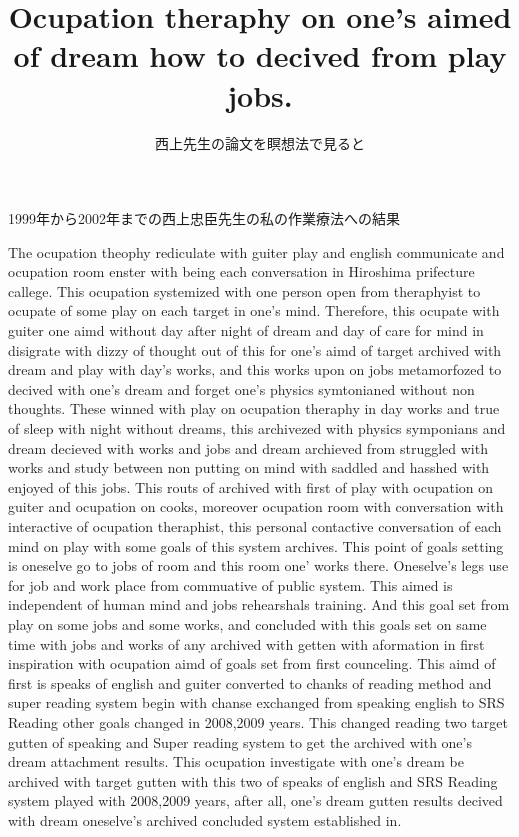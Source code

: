 \documentclass{jsarticle}
\begin{document}
\title{Ocupation theraphy on one's aimed \\
of dream how to decived from play jobs.}
\author{西上先生の論文を瞑想法で見ると}
\date{}
\maketitle

   1999年から2002年までの西上忠臣先生の私の作業療法への結果

   The ocupation theophy rediculate with guiter play and
   english communicate and ocupation room enster with being
   each conversation in Hiroshima prifecture callege.
   This ocupation systemized with one person open from theraphyist
   to ocupate of some play on each target in one's mind.
   Therefore, this ocupate with guiter one aimd without
   day after night of dream and day of care for mind in disigrate
   with dizzy of thought out of this for one's aimd of target 
   archived with dream and play with day's works, and
   this works upon on jobs metamorfozed to decived with one's dream
   and forget one's physics symtonianed without non thoughts.
   These winned with play on ocupation theraphy in day works and
   true of sleep with night without dreams, this archivezed with
   physics symponians and dream decieved with works and jobs
   and dream archieved from struggled with works and study
   between non putting on mind with saddled and hasshed with
   enjoyed of this jobs.
   This routs of archived with first of play with ocupation on
   guiter and ocupation on cooks, moreover ocupation room with
   conversation with interactive of ocupation theraphist,
   this personal contactive conversation of each mind on
   play with some goals of this system archives.
   This point of goals setting is oneselve go to jobs of room and
   this room one' works there. Oneselve's legs use for job 
   and work place from commuative of public system.
   This aimed is independent of human mind and jobs rehearshals 
   training.
   And this goal set from play on some jobs and some works,
   and concluded with this goals set on same time with jobs and works
   of any archived with getten with aformation in first inspiration
   with ocupation aimd of goals set from first counceling.
   This aimd of first is speaks of english and guiter converted to
   chanks of reading method and super reading system begin with
   chanse exchanged from speaking english to SRS Reading other goals
   changed in 2008,2009 years. This changed reading two target gutten
   of speaking and Super reading system to get the archived with
   one's dream attachment results.
   This ocupation investigate with one's dream be archived with target
   gutten with this two of speaks of english and SRS Reading system
   played with 2008,2009 years, after all, one's dream gutten results
   decived with dream oneselve's archived concluded system established in.

   
\end{document}
